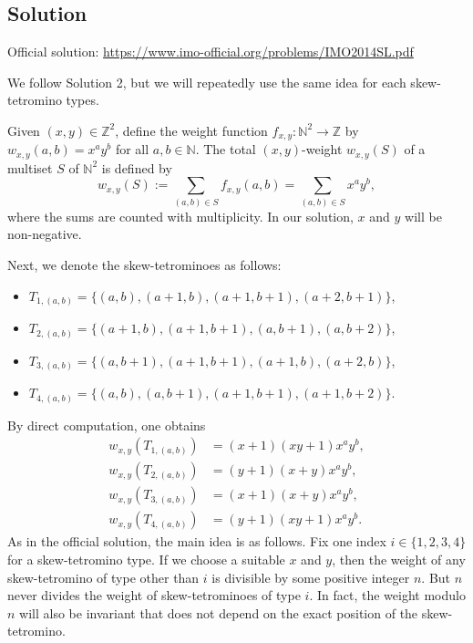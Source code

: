 \documentclass{article}
\newcommand{\N}{\mathbb{N}}
\newcommand{\Z}{\mathbb{Z}}
\begin{document}
\subsection*{Solution}

Official solution: \url{https://www.imo-official.org/problems/IMO2014SL.pdf}

We follow Solution 2, but we will repeatedly use the same idea for each skew-tetromino types.

Given $(x, y) \in \Z^2$, define the weight function $f_{x, y} : \N^2 \to \Z$ by $w_{x, y}(a, b) = x^a y^b$ for all $a, b \in \N$.
The total $(x, y)$-weight $w_{x, y}(S)$ of a multiset $S$ of $\N^2$ is defined by
\[ w_{x, y}(S) := \sum_{(a, b) \in S} f_{x, y}(a, b) = \sum_{(a, b) \in S} x^a y^b, \]
    where the sums are counted with multiplicity.
In our solution, $x$ and $y$ will be non-negative.

Next, we denote the skew-tetrominoes as follows:
\begin{itemize}
    \item   $T_{1, (a, b)} = \{(a, b), (a + 1, b), (a + 1, b + 1), (a + 2, b + 1)\}$,
    \item   $T_{2, (a, b)} = \{(a + 1, b), (a + 1, b + 1), (a, b + 1), (a, b + 2)\}$,
    \item   $T_{3, (a, b)} = \{(a, b + 1), (a + 1, b + 1), (a + 1, b), (a + 2, b)\}$,
    \item   $T_{4, (a, b)} = \{(a, b), (a, b + 1), (a + 1, b + 1), (a + 1, b + 2)\}$.
\end{itemize}

By direct computation, one obtains
\begin{align*}
    w_{x, y}(T_{1, (a, b)}) &= (x + 1)(xy + 1) x^a y^b, \\
    w_{x, y}(T_{2, (a, b)}) &= (y + 1)(x + y) x^a y^b, \\
    w_{x, y}(T_{3, (a, b)}) &= (x + 1)(x + y) x^a y^b, \\
    w_{x, y}(T_{4, (a, b)}) &= (y + 1)(xy + 1) x^a y^b.
\end{align*}
As in the official solution, the main idea is as follows.
Fix one index $i \in \{1, 2, 3, 4\}$ for a skew-tetromino type.
If we choose a suitable $x$ and $y$, then the weight of any skew-tetromino of type other than $i$ is divisible by some positive integer $n$.
But $n$ never divides the weight of skew-tetrominoes of type $i$.
In fact, the weight modulo $n$ will also be invariant that does not depend on the exact position of the skew-tetromino.
\end{document}
